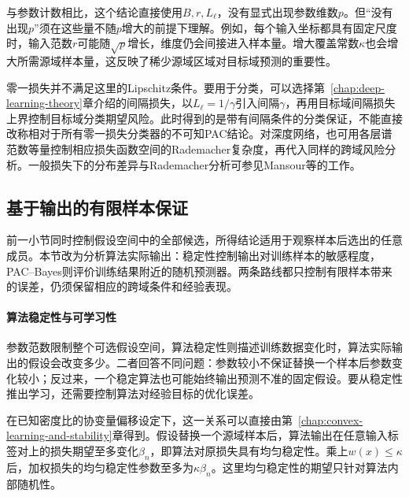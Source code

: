 与参数计数相比，这个结论直接使用$B,r,L_{\ell}$，没有显式出现参数维数$p$。但“没有出现$p$”须在这些量不随$p$增大的前提下理解。例如，每个输入坐标都具有固定尺度时，输入范数$r$可能随$\sqrt p$增长，维度仍会间接进入样本量。增大覆盖常数$\kappa$也会增大所需源域样本量，这反映了稀少源域区域对目标域预测的重要性。

零一损失并不满足这里的Lipschitz条件。要用于分类，可以选择第~\ref{chap:deep-learning-theory}章介绍的间隔损失，以$L_{\ell}=1/\gamma$引入间隔$\gamma$，再用目标域间隔损失上界控制目标域分类期望风险。此时得到的是带有间隔条件的分类保证，不能直接改称相对于所有零一损失分类器的不可知PAC结论。对深度网络，也可用各层谱范数等量控制相应损失函数空间的Rademacher复杂度，再代入同样的跨域风险分析。一般损失下的分布差异与Rademacher分析可参见Mansour等的工作。

\subsection{基于输出的有限样本保证}
\label{sec:transfer-stability}
\label{sec:adaptation-output-bounds}

前一小节同时控制假设空间中的全部候选，所得结论适用于观察样本后选出的任意成员。本节改为分析算法实际输出：稳定性控制输出对训练样本的敏感程度，PAC--Bayes则评价训练结果附近的随机预测器。两条路线都只控制有限样本带来的误差，仍须保留相应的跨域条件和经验表现。

\paragraph{算法稳定性与可学习性}

参数范数限制整个可选假设空间，算法稳定性则描述训练数据变化时，算法实际输出的假设会改变多少。二者回答不同问题：参数较小不保证替换一个样本后参数变化较小；反过来，一个稳定算法也可能始终输出预测不准的固定假设。要从稳定性推出学习，还需要控制算法对经验目标的优化误差。

在已知密度比的协变量偏移设定下，这一关系可以直接由第~\ref{chap:convex-learning-and-stability}章得到。假设替换一个源域样本后，算法输出在任意输入标签对上的损失期望至多变化$\beta_n$，即算法对原损失具有均匀稳定性。乘上$w(x)\leq\kappa$后，加权损失的均匀稳定性参数至多为$\kappa\beta_n$。这里均匀稳定性的期望只针对算法内部随机性。

